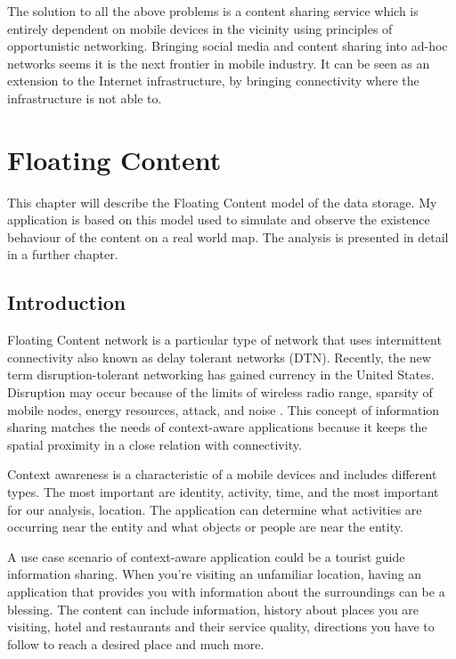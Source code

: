 The solution to all the above problems is a content sharing service which is
entirely dependent on mobile devices in the vicinity using principles of
opportunistic networking. Bringing social media and content sharing into ad-hoc
networks seems it is the next frontier in mobile industry. It can be seen as an
extension to the Internet infrastructure, by bringing connectivity where the
infrastructure is not able to.

\chapter{Floating Content}\label{chap2}

This chapter will describe the Floating Content model of the data storage.
My application is based on this model used to simulate and observe the existence
behaviour of the content on a real world map. The analysis is presented in
detail in a further chapter.

\section{Introduction}
Floating Content network is a particular type of network that uses intermittent
connectivity also known as delay tolerant networks (DTN). Recently, the new term
disruption-tolerant networking has gained currency in the United States.
Disruption may occur because of the limits of wireless radio range, sparsity of
mobile nodes, energy resources, attack, and noise \cite{wikipedia_dtn}.
This concept of information sharing matches the needs of context-aware
applications because it keeps the spatial proximity in a close relation with
connectivity.

Context awareness is a characteristic of a mobile devices and includes different
types. The most important are identity, activity, time, and the most important
for our analysis, location. The application can determine what activities are
occurring near the entity and what objects or people are near the entity.

A use case scenario of context-aware application could be a tourist guide
information sharing. When you're visiting an unfamiliar location, having an
application that provides you with information about the surroundings can be a
blessing. The content can include information, history about places you are
visiting, hotel and restaurants and their service quality, directions you have
to follow to reach a desired place and much more.

